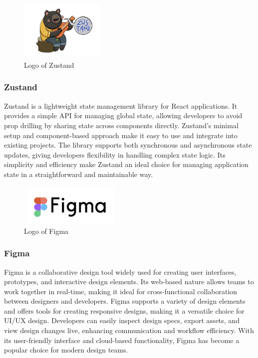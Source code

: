         \begin{figure}[htbp]
            \centerline{\includegraphics[width=4cm, height=3cm]{Images/logo/zustand.png}}
            \caption{Logo of Zustand}
            \label{fig}
        \end{figure}
        \subsubsection{Zustand}
            Zustand is a lightweight state management library for React applications. It provides a simple API for managing global state, allowing developers to avoid prop drilling by sharing state across components directly. Zustand's minimal setup and component-based approach make it easy to use and integrate into existing projects. The library supports both synchronous and asynchronous state updates, giving developers flexibility in handling complex state logic. Its simplicity and efficiency make Zustand an ideal choice for managing application state in a straightforward and maintainable way.

        \begin{figure}[htbp]
            \centerline{\includegraphics[width=5cm, height=2cm]{Images/logo/figma.png}}
            \caption{Logo of Figma}
            \label{fig}
        \end{figure}
        \subsubsection{Figma}
            Figma is a collaborative design tool widely used for creating user interfaces, prototypes, and interactive design elements. Its web-based nature allows teams to work together in real-time, making it ideal for cross-functional collaboration between designers and developers. Figma supports a variety of design elements and offers tools for creating responsive designs, making it a versatile choice for UI/UX design. Developers can easily inspect design specs, export assets, and view design changes live, enhancing communication and workflow efficiency. With its user-friendly interface and cloud-based functionality, Figma has become a popular choice for modern design teams.

